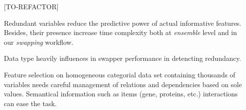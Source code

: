 [TO-REFACTOR]

Redundant variables reduce the predictive power of actual informative features. Besides, their presence increase time complexity both at \emph{ensemble} level and in our \emph{swapping} workflow.

Data type heavily influences in swapper performance in detencting redundancy.

Feature selection on homogeneous categorial data set containing thousands of variables needs careful management of relations and dependencies based on sole values. Semantical information such as items (gene, proteins, etc.) interactions can ease the task.